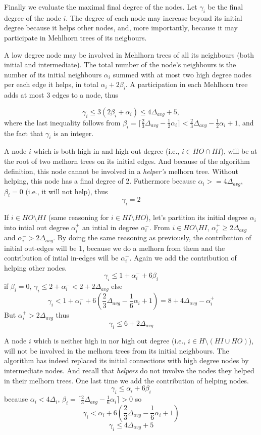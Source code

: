 \documentclass{article}
\begin{document}
\medskip

Finally we evaluate the maximal final degree of the nodes.
Let $\gamma_i$ be the final degree of the node $i$.
The degree of each node may increase beyond its initial degree because it helps other nodes, and, more importantly, because it may participate in Mehlhorn trees of its neigbours.

\medskip

A low degree node may be involved in Mehlhorn trees of all its neighbours (both initial and intermediate). 
The total number of the node's neighbours is the number of its initial neighbours $\alpha_i$
summed with at most two high degree nodes per each edge it helps, in total $\alpha_i + 2\beta_i$.
A participation in each Mehlhorn tree adds at most $3$ edges to a node, thus

  $$\gamma_i \leq 3(2\beta_i +\alpha_i) \leq 4\Delta_{avg} + 5,$$
  where the last inequality follows from 
  $\beta_i = \lceil\frac{2}{3}\Delta_{avg}-\frac{1}{2}\alpha_i\rceil < \frac{2}{3}\Delta_{avg} - \frac{1}{2}\alpha_i + 1$, and the fact that $\gamma_i$ is an integer.

\medskip

A node $i$ which is both high in and high out degree (i.e., $i \in HO \cap HI$),
will be at the root of two melhorn trees on its initial edges. And
because of the algorithm definition, this node cannot be involved
in a \emph{helper's} melhorn tree. Without helping, this node has a final
degree of 2. Futhermore because $\alpha_i >= 4\Delta_{avg}$, $\beta_i = 0$ (i.e., it will not help), thus
$$\gamma_i = 2$$

\medskip

If $i \in HO \setminus HI$ (same reasoning for $i \in HI \setminus HO$),
let's partition its initial degree $\alpha_i$ into intial out degree $\alpha_i^+$
an intial in degree $\alpha_i^-$. From $i \in HO \setminus HI$,
$\alpha_i^+ \geq 2\Delta_{avg}$ and $\alpha_i^- > 2\Delta_{avg}$.
By doing the same reasoning as previously, the contribution of
initial out-edges will be 1, because we do a melhorn from them
and the contribution of intial in-edges will be $\alpha_i^-$.
Again we add the contribution of helping other nodes.
$$\gamma_i \leq 1 + \alpha_i^- + 6\beta_i$$
if $\beta_i = 0$, $\gamma_i \leq 2 + \alpha_i^- < 2 + 2\Delta_{avg}$
else
$$\gamma_i < 1 + \alpha_i^- + 6(\frac{2}{3}\Delta_{avg} - \frac{1}{6}\alpha_i + 1) = 8 + 4\Delta_{avg} - \alpha_i^+$$
But $\alpha_i^+ > 2\Delta_{avg}$
thus $$\gamma_i \leq 6 + 2\Delta_{avg}$$

A node $i$ which is neither high in nor high out degree (i.e., $i \in H \setminus (HI \cup HO)$),
will not be involved in the melhorn trees from its initial neighbours. The algorithm
has indeed replaced its initial connections with high degree nodes by
intermediate nodes. And recall that \emph{helpers} do not involve
the nodes they helped in their melhorn trees.
One last time we add the contribution of helping nodes.
$$\gamma_i \leq \alpha_i + 6\beta_i$$
because $\alpha_i < 4\Delta_i$, $\beta_i = \lceil\frac{2}{3}\Delta_{avg}-\frac{1}{6}\alpha_i\rceil > 0$
so $$\gamma_i < \alpha_i + 6(\frac{2}{3}\Delta_{avg}-\frac{1}{6}\alpha_i + 1)$$
$$\gamma_i \leq 4\Delta_{avg} + 5$$
\end{document}

